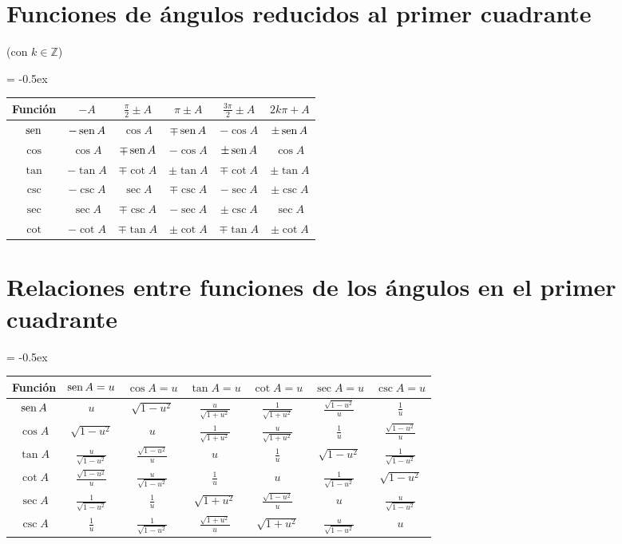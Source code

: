 \section*{Funciones de ángulos reducidos al primer cuadrante}
(con $k \in \mathbb{Z}$)
\begin{table}[htb]
\extrarowheight = -0.5ex
\renewcommand{\arraystretch}{1.71}
\centering
\begin{tabular}{|c|c|c|c|c|c|}
\hline
Función & $-A$ & $\frac{\pi}{2} \pm A$ & $\pi \pm A$ & $\frac{3\pi}{2} \pm A$ & $2k\pi + A$ \\ \hline
$\operatorname{sen}$ & $-\operatorname{sen} A$ & $\cos A$ & $\mp \operatorname{sen} A$ & $-\cos A$ & $\pm \operatorname{sen} A$ \\ \hline
$\cos$ & $\cos A$ & $\mp \operatorname{sen} A$ & $-\cos A$ & $\pm \operatorname{sen} A$ & $\cos A$ \\ \hline
$\tan$ & $-\tan A$ & $\mp \cot A$ & $\pm \tan A$ & $\mp \cot A$ & $\pm \tan A$ \\ \hline
$\csc$ & $-\csc A$ & $\sec A$ & $\mp \csc A$ & $-\sec A$ & $\pm \csc A$ \\ \hline
$\sec$ & $\sec A$ & $\mp \csc A$ & $-\sec A$ & $\pm \csc A$ & $\sec A$ \\ \hline
$\cot$ & $-\cot A$ & $\mp \tan A$ & $\pm \cot A$ & $\mp \tan A$ & $\pm \cot A$ \\ \hline
\end{tabular}
\end{table}

\section*{Relaciones entre funciones de los ángulos en el primer cuadrante}

\begin{table}[htb]
\extrarowheight = -0.5ex
\renewcommand{\arraystretch}{1.9}
\centering
\begin{tabular}{|c|c|c|c|c|c|c|}
\hline
Función & $\operatorname{sen} A = u$ & $\cos A = u $ & $\tan A = u$ & $\cot A = u$ & $\sec A = u$ & $\csc A = u$ \\ \hline
$\operatorname{sen} A$ & $u$ & $\sqrt{1-u^2}$ & $\frac{u}{\sqrt{1+u^2}}$ & $\frac{1}{\sqrt{1+u^2}}$ & $\frac{\sqrt{1-u^2}}{u}$ & $\frac{1}{u}$ \\ \hline
$\cos A$ & $\sqrt{1-u^2}$ & $u$ & $\frac{1}{\sqrt{1+u^2}}$ & $\frac{u}{\sqrt{1+u^2}}$ & $\frac{1}{u}$ & $\frac{\sqrt{1-u^2}}{u}$\\ \hline
$\tan A$ & $\frac{u}{\sqrt{1-u^2}}$ & $\frac{\sqrt{1-u^2}}{u}$ & $u$ & $\frac{1}{u}$ & $\sqrt{1-u^2}$ & $\frac{1}{\sqrt{1-u^2}}$\\ \hline
$\cot A$ & $\frac{\sqrt{1-u^2}}{u}$ & $\frac{u}{\sqrt{1-u^2}}$ & $\frac{1}{u}$ & $u$ & $\frac{1}{\sqrt{1-u^2}}$ & $\sqrt{1-u^2}$\\ \hline
$\sec A$ & $\frac{1}{\sqrt{1-u^2}}$ & $\frac{1}{u}$ & $\sqrt{1+u^2}$ & $\frac{\sqrt{1-u^2}}{u}$ & $u$ & $\frac{u}{\sqrt{1-u^2}}$\\ \hline
$\csc A$ & $\frac{1}{u}$ & $\frac{1}{\sqrt{1-u^2}}$ & $\frac{\sqrt{1+u^2}}{u}$ & $\sqrt{1+u^2}$ & $\frac{u}{\sqrt{1-u^2}}$ & $u$\\ \hline
\end{tabular}
\end{table}

